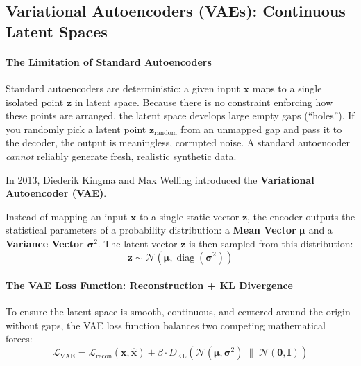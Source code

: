 \subsection{Variational Autoencoders (VAEs): Continuous Latent Spaces}\label{subsec:vae}

\paragraph{The Limitation of Standard Autoencoders}
Standard autoencoders are deterministic: a given input $\mathbf{x}$ maps to a single isolated point $\mathbf{z}$ in latent space. Because there is no constraint enforcing how these points are arranged, the latent space develops large empty gaps (``holes''). If you randomly pick a latent point $\mathbf{z}_{\text{random}}$ from an unmapped gap and pass it to the decoder, the output is meaningless, corrupted noise. A standard autoencoder \emph{cannot} reliably generate fresh, realistic synthetic data.

\begin{keyidea}
In 2013, Diederik Kingma and Max Welling introduced the \textbf{Variational Autoencoder (VAE)}. 

Instead of mapping an input $\mathbf{x}$ to a single static vector $\mathbf{z}$, the encoder outputs the statistical parameters of a probability distribution: a \textbf{Mean Vector} $\boldsymbol{\mu}$ and a \textbf{Variance Vector} $\boldsymbol{\sigma}^2$. The latent vector $\mathbf{z}$ is then sampled from this distribution:
\begin{equation*}
\mathbf{z} \sim \mathcal{N}(\boldsymbol{\mu}, \operatorname{diag}(\boldsymbol{\sigma}^2))
\end{equation*}
\end{keyidea}

\paragraph{The VAE Loss Function: Reconstruction + KL Divergence}
To ensure the latent space is smooth, continuous, and centered around the origin without gaps, the VAE loss function balances two competing mathematical forces:
\begin{equation}
\mathcal{L}_{\text{VAE}} = \mathcal{L}_{\text{recon}}(\mathbf{x}, \hat{\mathbf{x}}) + \beta \cdot D_{\text{KL}}\left(\mathcal{N}(\boldsymbol{\mu}, \boldsymbol{\sigma}^2) \;\parallel\; \mathcal{N}(\mathbf{0}, \mathbf{I})\right)\label{eq:vae_loss}
\end{equation}

